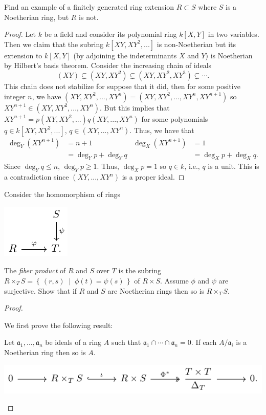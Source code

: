 \begin{problem}
Find an example of a finitely generated ring extension $R\subset
S$ where $S$ is a Noetherian ring, but $R$ is not.
\end{problem}
\begin{proof}
Let $k$ be a field and consider its polynomial ring $k[X,Y]$ in
two variables. Then we claim that the subring
$k[XY,XY^2,...]$ is non-Noetherian but its extension to
$k[X,Y]$ (by adjoining the indeterminants $X$ and $Y$)
is Noetherian by Hilbert's basis theorem. Consider the increasing
chain of ideals
\[
(XY)\subsetneq (XY,XY^2)\subsetneq(XY,XY^2,XY^3)\subsetneq\cdots.
\]
This chain does not stabilize for suppose that it did, then for
some positive integer $n$, we have
$(XY,XY^2,...,XY^n)=(XY,XY^2,...,XY^n,XY^{n+1})$ so
$XY^{n+1}\in(XY,XY^2,...,XY^n)$. But this implies that
$XY^{n+1}=p(XY,XY^2,...)q(XY,...,XY^n)$ for some polynomials $q\in
k[XY,XY^2,...]$, $q\in(XY,...,XY^n)$. Thus, we have that
\begin{align*}
\deg_Y(XY^{n+1})
&=n+1
&\deg_X(XY^{n+1})
&=1
\\
&=\deg_Y p+\deg_Y q
&&=\deg_X p+\deg_X q.
\end{align*}
Since $\deg_Y q\leq n$, $\deg_Y p\geq 1$. Thus, $\deg_X p=1$ so
$q\in k$, i.e., $q$ is a unit. This is a contradiction since
$(XY,...,XY^n)$ is a proper ideal.
\end{proof}
\newpage
\begin{problem}
Consider the homomorphism of rings
\begin{center}
\includegraphics{figures/hw-4-ring-maps}
\end{center}
The \emph{fiber product} of $R$ and $S$ over $T$ is the subring
$R\times_T S=\left\{\,(r,s)\;\middle|\;\phi(t)=\psi(s)\,\right\}$
of $R\times S$. Assume $\phi$ and $\psi$ are surjective. Show
that if $R$ and $S$ are Noetherian rings then so is $R\times_T
S$.
\end{problem}
\begin{proof}
\begin{center}
We first prove the following result:
\begin{lemma*}[Matsumura, Ex.\,3.1]
Let $\mathfrak{a}_1,...,\mathfrak{a}_n$ be ideals of a ring $A$
such that $\mathfrak{a}_1\cap\cdots\cap\mathfrak{a}_n=0$. If each
$A/\mathfrak{a}_i$ is a Noetherian ring then so is $A$.
\end{lemma*}
\includegraphics{figures/ps4-p2-short-exact-seq}
\end{center}
\end{proof}
